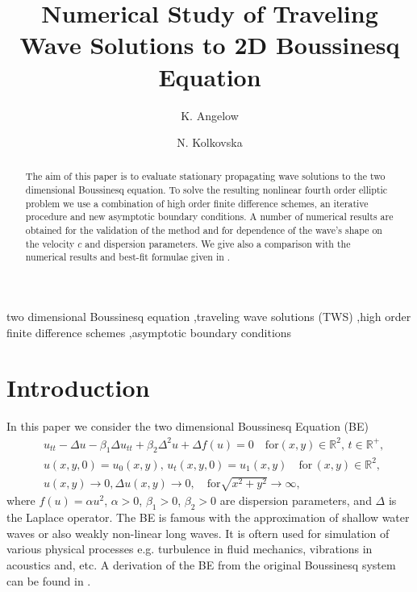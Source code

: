 \documentclass[preprint]{elsarticle}
\newcommand{\RR}{\mathbb{R}}
\begin{document}
\begin{frontmatter}

\title{Numerical Study of Traveling Wave Solutions to 2D Boussinesq  Equation}


\author{K. Angelow}

\author{N. Kolkovska}

\address{Institute of Mathematics and Informatics, Bulgarian Academy of Sciences, Acad. G.~Bonchev Bl.8, 1113 Sofia, Bulgaria}

\begin{abstract}
The aim of this paper is to evaluate stationary  propagating  wave solutions  
 to the two dimensional Boussinesq  equation. To solve the resulting nonlinear fourth order elliptic  problem we use a  combination of high order finite difference schemes, an iterative procedure  and  new asymptotic boundary conditions.   A number of numerical results are obtained for the validation of the method and for dependence of the wave's shape on the velocity $c$ and dispersion parameters. We give also a comparison with  the numerical results and best-fit formulae given in \cite{Ch2011,Ch2012}.

\end{abstract}
\begin{keyword}
two dimensional Boussinesq  equation \sep traveling wave solutions (TWS) \sep high order finite difference schemes \sep asymptotic boundary conditions
 \end{keyword}
\end{frontmatter}


\section{Introduction}\label{introduction}

In this paper we  consider the two dimensional Boussinesq  Equation (BE)
\begin{align}
&u_{tt} - \Delta u -\beta_1  \Delta u_{tt} +\beta_2 \Delta ^2 u + \Delta f(u)=0   \quad \text{for}  (x,y) \in \RR^2, \, t\in\RR^+,\label{eq1}
\\ \nonumber &u(x,y,0)=u_0(x,y), \, u_t(x,y,0)=u_1(x,y)   \quad\text{for} \, (x,y) \in \RR^2,
\\  &u(x,y) \rightarrow 0,  \Delta u(x,y) \rightarrow 0 ,  \quad \text{for}  \sqrt{x^2 + y^2} \rightarrow \infty, \label{eq11}
\end{align}
where   $f(u)=\alpha u^2$,  $\alpha>0$, $\beta_1>0$, $\beta_2>0$  are dispersion parameters, and $\Delta$ is the Laplace operator. The BE is famous with the approximation of shallow water waves or also weakly non-linear long waves. It is oftern used for simulation of various physical processes e.g. turbulence in fluid mechanics, vibrations in acoustics and, etc. A derivation of the BE from the original Boussinesq system can be found in \cite{ChChr}.
\end{document}
